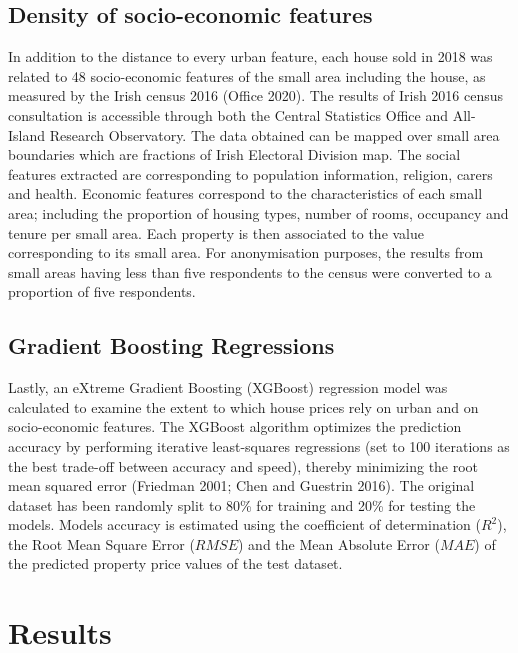 \documentclass[conference,final,]{IEEEtran}
\begin{document}
\hypertarget{density-of-socio-economic-features}{%
\subsection{Density of socio-economic features}\label{density-of-socio-economic-features}}

In addition to the distance to every urban feature, each house sold in 2018 was related to 48 socio-economic features of the small area including the house, as measured by the Irish census 2016 (Office 2020). The results of Irish 2016 census consultation is accessible through both the Central Statistics Office and All-Island Research Observatory. The data obtained can be mapped over small area boundaries which are fractions of Irish Electoral Division map. The social features extracted are corresponding to population information, religion, carers and health. Economic features correspond to the characteristics of each small area; including the proportion of housing types, number of rooms, occupancy and tenure per small area. Each property is then associated to the value corresponding to its small area. For anonymisation purposes, the results from small areas having less than five respondents to the census were converted to a proportion of five respondents.

\hypertarget{gradient-boosting-regressions}{%
\subsection{Gradient Boosting Regressions}\label{gradient-boosting-regressions}}

Lastly, an eXtreme Gradient Boosting (XGBoost) regression model was calculated to examine the extent to which house prices rely on urban and on socio-economic features. The XGBoost algorithm optimizes the prediction accuracy by performing iterative least-squares regressions (set to 100 iterations as the best trade-off between accuracy and speed), thereby minimizing the root mean squared error (Friedman 2001; Chen and Guestrin 2016). The original dataset has been randomly split to 80\% for training and 20\% for testing the models. Models accuracy is estimated using the coefficient of determination (\(R^2\)), the Root Mean Square Error (\(RMSE\)) and the Mean Absolute Error (\(MAE\)) of the predicted property price values of the test dataset.

\hypertarget{results}{%
\section{Results}\label{results}}
\end{document}
